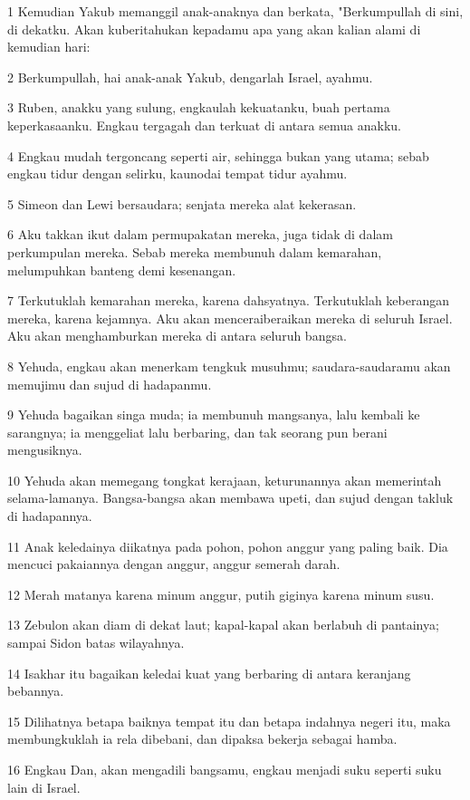 \par 1 Kemudian Yakub memanggil anak-anaknya dan berkata, "Berkumpullah di sini, di dekatku. Akan kuberitahukan kepadamu apa yang akan kalian alami di kemudian hari:
\par 2 Berkumpullah, hai anak-anak Yakub, dengarlah Israel, ayahmu.
\par 3 Ruben, anakku yang sulung, engkaulah kekuatanku, buah pertama keperkasaanku. Engkau tergagah dan terkuat di antara semua anakku.
\par 4 Engkau mudah tergoncang seperti air, sehingga bukan yang utama; sebab engkau tidur dengan selirku, kaunodai tempat tidur ayahmu.
\par 5 Simeon dan Lewi bersaudara; senjata mereka alat kekerasan.
\par 6 Aku takkan ikut dalam permupakatan mereka, juga tidak di dalam perkumpulan mereka. Sebab mereka membunuh dalam kemarahan, melumpuhkan banteng demi kesenangan.
\par 7 Terkutuklah kemarahan mereka, karena dahsyatnya. Terkutuklah keberangan mereka, karena kejamnya. Aku akan menceraiberaikan mereka di seluruh Israel. Aku akan menghamburkan mereka di antara seluruh bangsa.
\par 8 Yehuda, engkau akan menerkam tengkuk musuhmu; saudara-saudaramu akan memujimu dan sujud di hadapanmu.
\par 9 Yehuda bagaikan singa muda; ia membunuh mangsanya, lalu kembali ke sarangnya; ia menggeliat lalu berbaring, dan tak seorang pun berani mengusiknya.
\par 10 Yehuda akan memegang tongkat kerajaan, keturunannya akan memerintah selama-lamanya. Bangsa-bangsa akan membawa upeti, dan sujud dengan takluk di hadapannya.
\par 11 Anak keledainya diikatnya pada pohon, pohon anggur yang paling baik. Dia mencuci pakaiannya dengan anggur, anggur semerah darah.
\par 12 Merah matanya karena minum anggur, putih giginya karena minum susu.
\par 13 Zebulon akan diam di dekat laut; kapal-kapal akan berlabuh di pantainya; sampai Sidon batas wilayahnya.
\par 14 Isakhar itu bagaikan keledai kuat yang berbaring di antara keranjang bebannya.
\par 15 Dilihatnya betapa baiknya tempat itu dan betapa indahnya negeri itu, maka membungkuklah ia rela dibebani, dan dipaksa bekerja sebagai hamba.
\par 16 Engkau Dan, akan mengadili bangsamu, engkau menjadi suku seperti suku lain di Israel.
